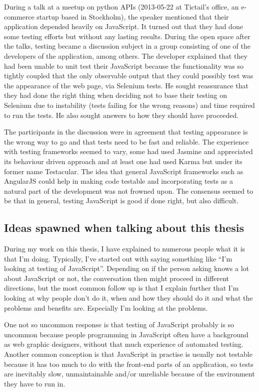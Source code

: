 \documentclass[11pt]{article}
\begin{document}
During a talk at a meetup on python APIs (2013-05-22 at Tictail's office, an e-commerce startup based in Stockholm), the speaker mentioned that their application depended heavily on JavaScript. It turned out that they had done some testing efforts but without any lasting results. During the open space after the talks, testing became a discussion subject in a group consisting of one of the developers of the application, among others. The developer explained that they had been unable to unit test their JavaScript because the functionality was so tightly coupled that the only observable output that they could possibly test was the appearance of the web page, via Selenium tests. He sought reassurance that they had done the right thing when deciding not to base their testing on Selenium due to instability (tests failing for the wrong reasons) and time required to run the tests. He also sought answers to how they should have proceeded.

The participants in the discussion were in agreement that testing appearance is the wrong way to go and that tests need to be fast and reliable. The experience with testing frameworks seemed to vary, some had used Jasmine and appreciated its behaviour driven approach and at least one had used Karma but under its former name Testacular. The idea that general JavaScript frameworks such as AngularJS could help in making code testable and incorporating tests as a natural part of the development was not frowned upon. The consensus seemed to be that in general, testing JavaScript is good if done right, but also difficult.

\subsection{Ideas spawned when talking about this thesis}

During my work on this thesis, I have explained to numerous people what it is that I'm doing. Typically, I've started out with saying something like ``I'm looking at testing of JavaScript''. Depending on if the person asking knows a lot about JavaScript or not, the conversation then might proceed in different directions, but the most common follow up is that I explain further that I'm looking at why people don't do it, when and how they should do it and what the problems and benefits are. Especially I'm looking at the problems.

One not so uncommon response is that testing of JavaScript probably is so uncommon because people programming in JavaScript often have a background as web graphic designers, without that much experience of automated testing. Another common conception is that JavaScript in practise is usually not testable because it has too much to do with the front-end parts of an application, so tests are inevitably slow, unmaintainable and/or unreliable because of the environment they have to run in.
\end{document}
